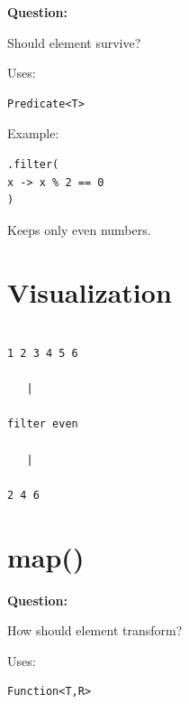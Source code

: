 \documentclass[11pt,a4paper]{book}
\begin{document}
\textbf{Question:}


Should element survive?


Uses:

\begin{verbatim} 
Predicate<T>
\end{verbatim}


Example:

\begin{verbatim} 
.filter(
x -> x % 2 == 0
)
\end{verbatim}


Keeps only even numbers.


\section{Visualization}

\begin{verbatim}

1 2 3 4 5 6

   |

filter even

   |

2 4 6

\end{verbatim}


\section{map()}

\textbf{Question:}


How should element transform?


Uses:

\begin{verbatim} 
Function<T,R>
\end{verbatim}
\end{document}
